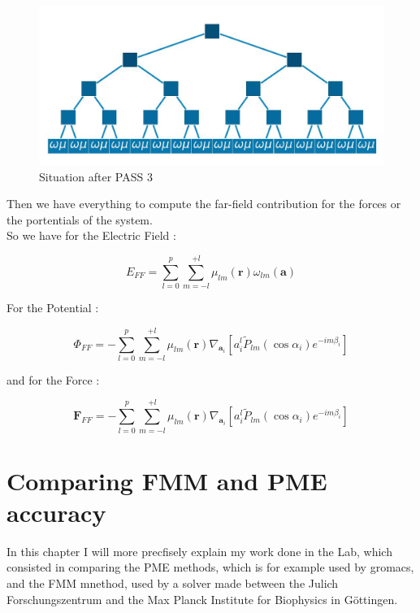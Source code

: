 \documentclass[12pt,twoside,a4paper]{report}
\begin{document}
\begin{figure}[H]
	\label{fig:farfield}
   \includegraphics[scale=0.5]{farfield}
    \centering 
    \caption{Situation after PASS 3 }
    
   \end{figure} 
   
   Then we have everything to compute the far-field contribution for the forces or the portentials of the system.\\
   
   So we have for the Electric Field :
      
   \begin{equation}
   E_{FF} = \sum\limits_{l=0}^{p} \sum\limits_{m=-l}^{+l} \mu_{lm}(\textbf{r}) \omega_{lm}(\textbf{a})
   \end{equation}
   
   For the Potential :
 
 	\begin{equation}
   \Phi_{FF} = - \sum\limits_{l=0}^{p} \sum\limits_{m=-l}^{+l} \mu_{lm}(\textbf{r}) \nabla_{\textbf{a}_i}[a_i^l \widetilde{P}_{lm}(\cos\alpha_i)e^{-im\beta_i}]
   \end{equation}
   
   and for the Force :
   
   \begin{equation}
   \textbf{F}_{FF} = - \sum\limits_{l=0}^{p} \sum\limits_{m=-l}^{+l} \mu_{lm}(\textbf{r}) \nabla_{\textbf{a}_i}[a_i^l \widetilde{P}_{lm}(\cos\alpha_i)e^{-im\beta_i}]
   \end{equation}
   
 

 

\chapter{Comparing FMM and PME accuracy}

    In this chapter I will more precfisely explain my work done in the Lab, which consisted in comparing the PME methods, which is for example used by gromacs, and the FMM mnethod, used by a solver made between the Julich Forschungszentrum and the Max Planck Institute for Biophysics in Göttingen.
\end{document}
